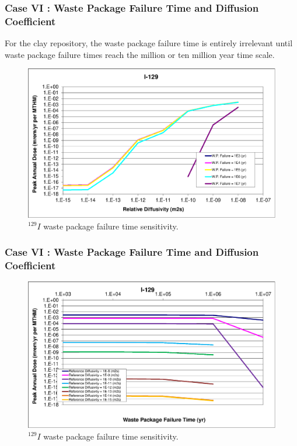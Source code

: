 \begin{frame}[c]
  \frametitle{Case VI : Waste Package Failure Time and Diffusion Coefficient}

For the clay repository, the waste package failure time is entirely irrelevant 
until waste package failure times reach the million or ten million year time 
scale. 

\begin{figure}[ht!]
\centering
\includegraphics[width=\linewidth]{WPFailExtended/I-129.eps}
\caption{$^{129}I$ waste package failure time sensitivity. }
\label{fig:WPFailI129}
\end{figure}
\end{frame}

\begin{frame}[c]
  \frametitle{Case VI : Waste Package Failure Time and Diffusion Coefficient}

\begin{figure}[ht!]
\centering
\includegraphics[width=\linewidth]{WPFailExtended/I-129-WPFail.eps}
\caption{$^{129}I$ waste package failure time sensitivity. }
\label{fig:WPFailI129}
\end{figure}
\end{frame}

